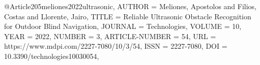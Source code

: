 @Article{205meliones2022ultrasonic,
AUTHOR = {Meliones, Apostolos and Filios, Costas and Llorente, Jairo},
TITLE = {Reliable Ultrasonic Obstacle Recognition for Outdoor Blind Navigation},
JOURNAL = {Technologies},
VOLUME = {10},
YEAR = {2022},
NUMBER = {3},
ARTICLE-NUMBER = {54},
URL = {https://www.mdpi.com/2227-7080/10/3/54},
ISSN = {2227-7080},
DOI = {10.3390/technologies10030054},}